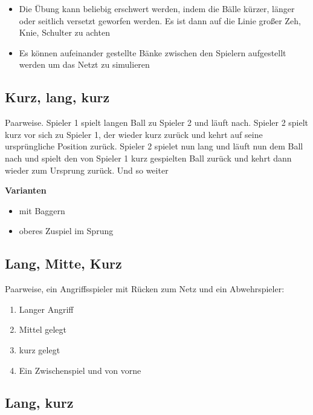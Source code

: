 \documentclass[]{book}
\providecommand{\tightlist}{%
  \setlength{\itemsep}{0pt}\setlength{\parskip}{0pt}}
\begin{document}
\begin{itemize}
\item
  Die Übung kann beliebig erschwert werden, indem die Bälle kürzer,
  länger oder seitlich versetzt geworfen werden. Es ist dann auf die
  Linie großer Zeh, Knie, Schulter zu achten
\item
  Es können aufeinander gestellte Bänke zwischen den Spielern
  aufgestellt werden um das Netzt zu simulieren
\end{itemize}

\subsection{Kurz, lang, kurz}\label{kurz-lang-kurz}

Paarweise. Spieler 1 spielt langen Ball zu Spieler 2 und läuft nach.
Spieler 2 spielt kurz vor sich zu Spieler 1, der wieder kurz zurück und
kehrt auf seine ursprüngliche Position zurück. Spieler 2 spielet nun
lang und läuft nun dem Ball nach und spielt den von Spieler 1 kurz
gespielten Ball zurück und kehrt dann wieder zum Ursprung zurück. Und so
weiter

\textbf{Varianten}

\begin{itemize}
\tightlist
\item
  mit Baggern
\item
  oberes Zuspiel im Sprung
\end{itemize}

\subsection{Lang, Mitte, Kurz}\label{lang-mitte-kurz}

Paarweise, ein Angriffsspieler mit Rücken zum Netz und ein
Abwehrspieler:

\begin{enumerate}
\def\labelenumi{\arabic{enumi}.}
\tightlist
\item
  Langer Angriff
\item
  Mittel gelegt
\item
  kurz gelegt
\item
  Ein Zwischenspiel und von vorne
\end{enumerate}

\subsection{Lang, kurz}\label{lang-kurz}
\end{document}

